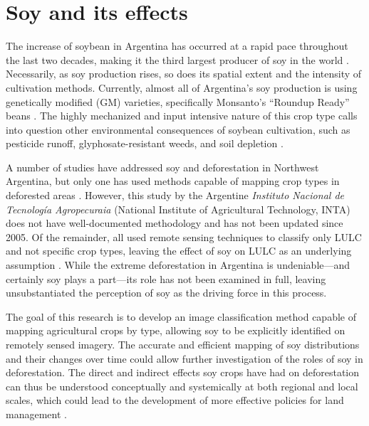 \section{Soy and its effects}

The increase of soybean in Argentina has occurred at a rapid pace throughout the last two decades, making it the third largest producer of soy in the world \autocite{us-foreign-agri2013world}. Necessarily, as soy production rises, so does its spatial extent and the intensity of cultivation methods. Currently, almost all of Argentina’s soy production is using genetically modified (GM) varieties, specifically Monsanto’s “Roundup Ready” beans \autocite{greenpeace-inte2005the-expanding}. The highly mechanized and input intensive nature of this crop type calls into question other environmental consequences of soybean cultivation, such as pesticide runoff, glyphosate-resistant weeds, and soil depletion \autocite{pengue2005transgenic}.

A number of studies have addressed soy and deforestation in Northwest Argentina, but only one has used methods capable of mapping crop types in deforested areas \autocite{volante2005analisis}. However, this study by the Argentine \textit{Instituto Nacional de Tecnología Agropecuraia} (National Institute of Agricultural Technology, INTA) does not have well-documented methodology and has not been updated since 2005. Of the remainder, all used remote sensing techniques to classify only LULC and not specific crop types, leaving the effect of soy on LULC as an underlying assumption \autocites{grau2005agriculture}
{grau2008balancing}{grau2005globalization}
{boletta2006assessing}{gasparri2009deforestation}. While the extreme deforestation in Argentina is undeniable---and certainly soy plays a part---its role has not been examined in full, leaving unsubstantiated the perception of soy as the driving force in this process.

The goal of this research is to develop an image classification method capable of mapping agricultural crops by type, allowing soy to be explicitly identified on remotely sensed imagery. The accurate and efficient mapping of soy distributions and their changes over time could allow further investigation of the roles of soy in deforestation. The direct and indirect effects soy crops have had on deforestation can thus be understood conceptually and systemically at both regional and local scales, which could lead to the development of more effective policies for land management \autocite{brown2007multitemporal}.



